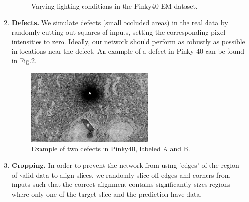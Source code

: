 \documentclass{article}
\begin{document}
\begin{enumerate}
\begin{figure}[!ht]
	\caption[Various lighting conditions in Pinky40]{Varying lighting conditions in the Pinky40 EM dataset.}\label{lighting}
\end{figure}
\item \textbf{Defects.} We simulate defects (small occluded areas) in the real data by randomly cutting out squares of inputs, setting the corresponding pixel intensities to zero. Ideally, our network should perform as robustly as possible in locations near the defect. An example of a defect in Pinky 40 can be found in Fig.\ref{defect}.
\begin{figure}[!ht]
	\centering
	\includegraphics[width=0.6\textwidth]{defects}
	\caption[Example of two defects in Pinky40]{Example of two defects in Pinky40, labeled A and B.}\label{defect}
\end{figure}

\item \textbf{Cropping.} In order to prevent the network from using `edges' of the region of valid data to align slices, we randomly slice off edges and corners from inputs such that the correct alignment contains significantly sizes regions where only one of the target slice and the prediction have data.
\end{enumerate}
\end{document}
